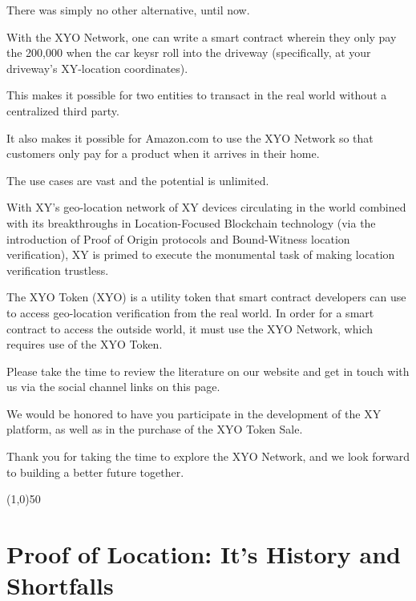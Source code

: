 \documentclass{article}
\begin{document}
There was simply no other alternative, until now. 

With the XYO Network, one can write a smart contract wherein they only pay the 200,000 when the car keysr roll into the driveway (specifically, at your driveway's XY-location coordinates).

This makes it possible for two entities to transact in the real world without a centralized third party.

It also makes it possible for Amazon.com to use the XYO Network so that customers only pay for a product when it arrives in their home.

The use cases are vast and the potential is unlimited.

With XY's geo-location network of XY devices circulating in the world combined with its breakthroughs in Location-Focused Blockchain technology (via the introduction of Proof of Origin protocols and Bound-Witness location verification), XY is primed to execute the monumental task of making location verification trustless. 

The XYO Token (XYO) is a utility token that smart contract developers can use to access geo-location verification from the real world. In order for a smart contract to access the outside world, it must use the XYO Network, which requires use of the XYO Token.

Please take the time to review the literature on our website and get in touch with us via the social channel links on this page. 

We would be honored to have you participate in the development of the XY platform, as well as in the purchase of the XYO Token Sale.

Thank you for taking the time to explore the XYO Network, and we look forward to building a better future together. 

\begin{center}
\line(1,0){50}
\end{center}


\section*{Proof of Location: It's History and Shortfalls}
\end{document}
